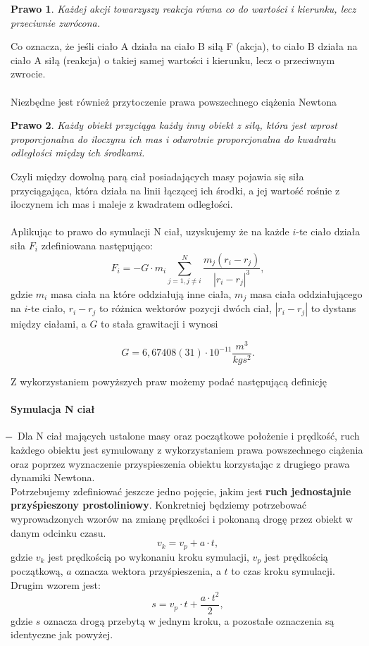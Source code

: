 \documentclass[14pt,twoside,a4paper]{article}
\newtheorem{theorem}{Prawo}
\theoremstyle{definition}
\begin{document}
\begin{theorem}
Każdej akcji towarzyszy reakcja równa co do wartości i kierunku, lecz przeciwnie zwrócona.
\end{theorem} 
Co oznacza, że jeśli ciało A działa na ciało B siłą F (akcja), to ciało B działa na ciało A siłą (reakcja) o takiej samej wartości i kierunku, lecz o przeciwnym zwrocie.\\~\\


Niezbędne jest również przytoczenie prawa powszechnego ciążenia Newtona \cite[str.~4-5]{fund}
\begin{theorem}
Każdy obiekt przyciąga każdy inny obiekt z siłą, która jest wprost proporcjonalna do iloczynu ich mas i odwrotnie proporcjonalna do kwadratu odległości między ich środkami.
\end{theorem}
Czyli między dowolną parą ciał posiadających masy pojawia się siła przyciągająca, która działa na linii łączącej ich środki, a jej wartość rośnie z iloczynem ich mas i maleje z kwadratem odległości.\\~\\

Aplikując to prawo do symulacji N ciał, uzyskujemy że na każde $i$-te ciało działa siła $F_i$ zdefiniowana następująco:\\
$$F_i = -G\cdot m_i \sum_{j=1, j\neq i}^N \frac{m_j(r_i - r_j)}{|r_i - r_j|^3},$$gdzie $m_i$ masa ciała na które oddziałują inne ciała, $m_j$ masa ciała oddziałującego na $i$-te ciało, $r_i - r_j$ to różnica wektorów pozycji dwóch ciał, $|r_i - r_j|$ to dystans między ciałami, a $G$ to stała grawitacji i wynosi
\begin{center}
$$G = 6,67408(31)\cdot 10^{-11} \frac{m^{3}}{kg s^2}.$$
\end{center}
Z wykorzystaniem powyższych praw możemy podać następującą definicję
\paragraph{Symulacja N ciał} 
\newcommand{\mi}{\boldsymbol{} \mathrel{\mkern -16mu} \boldsymbol{-}}
$\mi$
Dla N ciał mających ustalone masy oraz początkowe położenie i prędkość, ruch każdego obiektu jest symulowany z wykorzystaniem prawa powszechnego ciążenia oraz poprzez wyznaczenie przyspieszenia obiektu korzystając z drugiego prawa dynamiki Newtona.\\
\bigskip
Potrzebujemy zdefiniować jeszcze jedno pojęcie, jakim jest \textbf{ruch jednostajnie przyśpieszony prostoliniowy}.
Konkretniej będziemy potrzebować wyprowadzonych wzorów na zmianę prędkości i pokonaną drogę przez obiekt w danym odcinku czasu.
$$v_k = v_p + a\cdot t,$$ gdzie $v_k$ jest prędkością po wykonaniu kroku symulacji, $v_p$ jest prędkością początkową, $a$ oznacza wektora przyśpieszenia, a $t$ to czas kroku symulacji.\\
Drugim wzorem jest:
$$s = v_p\cdot t + \frac{a\cdot t^2}{2},$$ gdzie $s$ oznacza drogą przebytą w jednym kroku, a pozostałe oznaczenia są identyczne jak powyżej.
\end{document}

